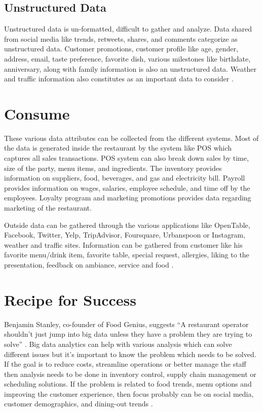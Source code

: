 \documentclass[sigconf]{acmart}
\begin{document}
\subsection{Unstructured Data}
Unstructured data is un-formatted, difficult to gather and analyze. Data shared from social media like trends, retweets, shares, and comments categorize as unstructured data. Customer promotions, customer profile like age, gender, address, email, taste preference, favorite dish, various milestones like birthdate, anniversary, along with family information is also an unstructured data. Weather and traffic information also constitutes as an important data to consider \cite{www-restaurant}. 


\section{Consume}
These various data attributes can be collected from the different systems. Most of the data is generated inside the restaurant by the system like POS which captures all sales transactions. POS system can also break down sales by time, size of the party, menu items, and ingredients. The inventory provides information on suppliers, food, beverages, and gas and electricity bill. Payroll provides information on wages, salaries, employee schedule, and time off by the employees. Loyalty program and marketing promotions provides data regarding marketing of the restaurant.


Outside data can be gathered through the various applications like OpenTable, Facebook, Twitter, Yelp, TripAdvisor, Foursquare, Urbanspoon or Instagram, weather and traffic sites. Information can be gathered from customer like his favorite menu/drink item, favorite table, special request, allergies, liking to the presentation, feedback on ambiance, service and food \cite{www-restaurant}. 

\section{Recipe for Success}
Benjamin Stanley, co-founder of Food Genius, suggests ``A restaurant operator shouldn't just jump into big data unless they have a problem they are trying to solve'' \cite{KooserAmandaC.2013BD}. Big data analytics can help with various analysis which can solve different issues but it's important to know the problem which needs to be solved. If the goal is to reduce costs, streamline operations or better manage the staff then analysis needs to be done in inventory control, supply chain management or scheduling solutions. If the problem is related to food trends, menu options and improving the customer experience, then focus probably can be on social media, customer demographics, and dining-out trends \cite{www-restaurant}.
 
\end{document}
